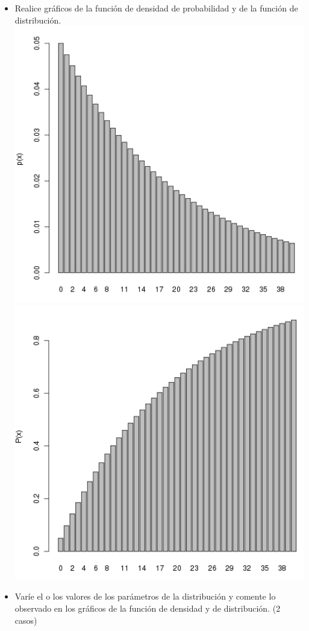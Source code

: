 \begin{itemize}
	\item Realice gr\'aficos de la funci\'on de densidad de probabilidad y de la funci\'on de distribuci\'on.\\
	\includegraphics[scale=0.5]{images/1_2-dgeom}\\	%
	\includegraphics[scale=0.5]{images/1_2-pgeom}\\	%
	\item Var\'ie el o los valores de los par\'ametros de la distribuci\'on y comente lo observado en los gr\'aficos de la funci\'on de densidad y de distribuci\'on. (2 casos)\\\\


\end{itemize}
